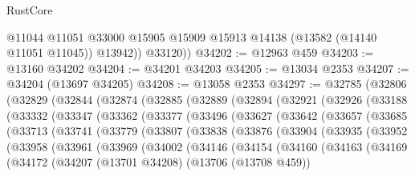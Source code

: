 \begin{lexlean}{RustCore}
\begin{coremodule}
            @11044
            @11051
            @33000
            @15905
            @15909
            @15913
            @14138
            (@13582 (@14140 @11051 @11045))
            @13942))
        @33120))
@34202 := @12963 @459
@34203 := @13160 @34202
@34204 := @34201 @34203
@34205 := @13034 @2353
@34207 := @34204 (@13697 @34205)
@34208 := @13058 @2353
@34297 := @32785
    (@32806
      (@32829
        (@32844
          (@32874
            (@32885
              (@32889
                (@32894
                  (@32921
                    (@32926
                      (@33188
                        (@33332
                          (@33347
                            (@33362
                              (@33377
                                (@33496
                                  (@33627
                                    (@33642
                                      (@33657
                                        (@33685
                                          (@33713
                                            (@33741
                                              (@33779
                                                (@33807
                                                  (@33838
                                                    (@33876
                                                      (@33904
                                                        (@33935
                                                          (@33952
                                                            (@33958
                                                              (@33961
                                                                (@33969
                                                                  (@34002
                                                                    (@34146
                                                                      (@34154
                                                                        (@34160
                                                                          (@34163
                                                                            (@34169
                                                                              (@34172
                                                                                (@34207
                                                                                  (@13701 @34208)
                                                                                  (@13706
                                                                                    (@13708 @459))

\end{coremodule}
\end{lexlean}
